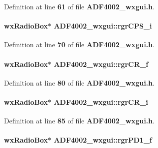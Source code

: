 Definition at line {\bf 61} of file {\bf A\+D\+F4002\+\_\+wxgui.\+h}.

\paragraph[{rgr\+C\+P\+S\+\_\+i}]{\setlength{\rightskip}{0pt plus 5cm}wx\+Radio\+Box$\ast$ A\+D\+F4002\+\_\+wxgui\+::rgr\+C\+P\+S\+\_\+i}\label{classADF4002__wxgui_ab2e2e95ad34fd2f0a982318c8f95ec5b}


Definition at line {\bf 70} of file {\bf A\+D\+F4002\+\_\+wxgui.\+h}.

\paragraph[{rgr\+C\+R\+\_\+f}]{\setlength{\rightskip}{0pt plus 5cm}wx\+Radio\+Box$\ast$ A\+D\+F4002\+\_\+wxgui\+::rgr\+C\+R\+\_\+f}\label{classADF4002__wxgui_ac37775ac353325ee062e0a2f17557fcc}


Definition at line {\bf 80} of file {\bf A\+D\+F4002\+\_\+wxgui.\+h}.

\paragraph[{rgr\+C\+R\+\_\+i}]{\setlength{\rightskip}{0pt plus 5cm}wx\+Radio\+Box$\ast$ A\+D\+F4002\+\_\+wxgui\+::rgr\+C\+R\+\_\+i}\label{classADF4002__wxgui_a701c258601c764e84284a27f9c225ac6}


Definition at line {\bf 85} of file {\bf A\+D\+F4002\+\_\+wxgui.\+h}.

\paragraph[{rgr\+P\+D1\+\_\+f}]{\setlength{\rightskip}{0pt plus 5cm}wx\+Radio\+Box$\ast$ A\+D\+F4002\+\_\+wxgui\+::rgr\+P\+D1\+\_\+f}\label{classADF4002__wxgui_a60b7ae043226d231ad33d3286d7664c2}


